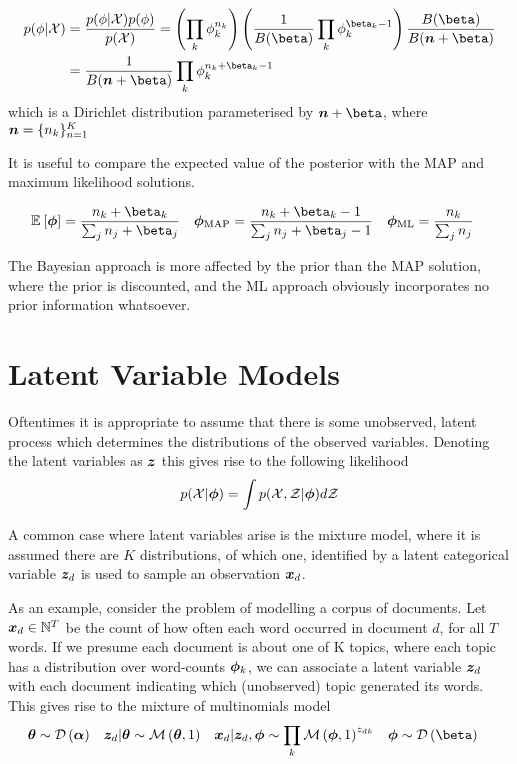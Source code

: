 \begin{align}
\begin{split}
p(\phi|\xdat) 
& = \frac{p(\phi|\xdat)p(\phi)}{p(\xdat)}
 = \left(\prod_k \phi_k^{n_k} \right)
   \left(\oneover{B(\vv{\beta})} \prod_k \phi_k^{\beta_k - 1} \right)
   \frac{B(\vv{\beta})}{B(\vv{n} + \vv{\beta})} \\
& = \oneover{B(\vv{n} + \vv{\beta})} \prod_k \phi_k^{n_k + \beta_k - 1}
\end{split}
\end{align}
which is a Dirichlet distribution parameterised by $\vv{n} + \vv{\beta}$, where $\bm n = \{ n_k \}_{n=1}^K$

It is useful to compare the expected value of the posterior with the MAP and maximum likelihood solutions.

\begin{align}
\ex{\param}{}  &= \frac{n_k + \beta_k}{\sum_j n_j + \beta_j} &
\map{\param} &= \frac{n_k + \beta_k - 1}{\sum_j n_j + \beta_j - 1} &
\ml{\param}  &= \frac{n_k}{\sum_j n_j}
\end{align}

The Bayesian approach is more affected by the prior than the MAP solution, where the prior is discounted, and the ML approach obviously incorporates no prior information whatsoever.
 
\section{Latent Variable Models}
Oftentimes it is appropriate to assume that there is some unobserved, latent process which determines the distributions of the observed variables. Denoting the latent variables as $\bm z$ this gives rise to the following likelihood
\begin{align}
p({ \mathcal{X} }|{ \bm \phi }) = \int p({ \mathcal{X} }, { \mathcal{Z} }|{ \bm \phi }) d{ \mathcal{Z} }
\end{align}

A common case where latent variables arise is the mixture model, where it is assumed there are $K$ distributions, of which one, identified by a latent categorical variable $\bm z_d$ is used to sample an observation ${ \bm x_d }$. 

As an example, consider the problem of modelling a corpus of documents. Let ${ \bm x_d } \in \mathbb{N}^T$ be the count of how often each word occurred in document $d$, for all $T$ words. If we presume each document is about one of K topics, where each topic has a distribution over word-counts $\bm \phi_k$, we can associate a latent variable $\bm z_d$ with each document indicating which (unobserved) topic generated its words. This gives rise to the mixture of multinomials model\cite{Nigam2000}
\begin{align}
\vv{\theta} & \sim \dir{\vv{\alpha}} &
\vv{z}_d|\vv{\theta} & \sim \muln{\vv{\theta}}{1} & 
\vv{x}_d|\vv{z}_d, \param & \sim \prod_k \muln{\param}{1}^{z_{dk}} & 
\param & \sim \dir{\vv{\beta}}
\end{align}


